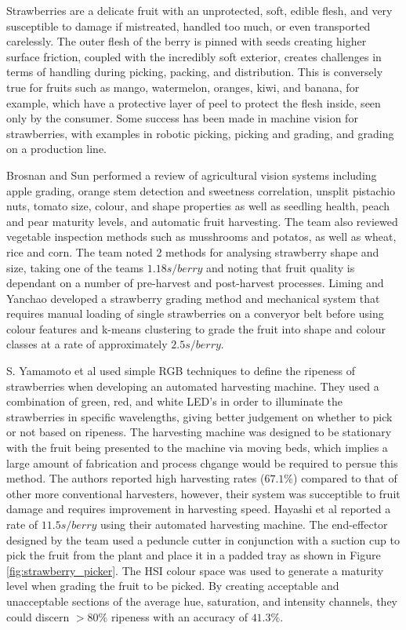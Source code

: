 \documentclass[fleqn,twoside]{article}
\begin{document}
Strawberries are a delicate fruit with an unprotected, soft, edible flesh, and very susceptible to damage if mistreated, handled too much, or even transported carelessly. The outer flesh of the berry is pinned with seeds creating higher surface friction, coupled with the incredibly soft exterior, creates challenges in terms of handling during picking, packing, and distribution. This is conversely true for fruits such as mango, watermelon, oranges, kiwi, and banana, for example, which have a protective layer of peel to protect the flesh inside, seen only by the consumer. Some success has been made in machine vision for strawberries, with examples in robotic picking, picking and grading, and grading on a production line. 

Brosnan and Sun \cite{brosnan} performed a review of agricultural vision systems including apple grading, orange stem detection and sweetness correlation, unsplit pistachio nuts, tomato size, colour, and shape properties as well as seedling health, peach and pear maturity levels, and automatic fruit harvesting. The team also reviewed vegetable inspection methods such as musshrooms and potatos, as well as wheat, rice and corn. The team noted 2 methods for analysing strawberry shape and size, taking one of the teams $1.18 s/berry$ and noting that fruit quality is dependant on a number of pre-harvest and post-harvest processes. Liming and Yanchao \cite{liming} developed a strawberry grading method and mechanical system that requires manual loading of single strawberries on a converyor belt before using colour features and k-means clustering to grade the fruit into shape and colour classes at a rate of approximately $2.5s/berry$. 

S. Yamamoto et al \cite{yamamoto2} used simple RGB techniques to define the ripeness of strawberries when developing an automated harvesting machine. They used a combination of green, red, and white LED's in order to illuminate the strawberries in specific wavelengths, giving better judgement on whether to pick or not based on ripeness. The harvesting machine was designed to be stationary with the fruit being presented to the machine via moving beds, which implies a large amount of fabrication and process chgange would be required to persue this method. The authors reported high harvesting rates ($67.1\%$) compared to that of other more conventional harvesters, however, their system was succeptible to fruit damage and requires improvement in harvesting speed. Hayashi et al \cite{hayashi} reported a rate of $11.5s/berry$ using their automated harvesting machine. The end-effector designed by the team used a peduncle cutter in conjunction with a suction cup to pick the fruit from the plant and place it in a padded tray as shown in Figure \ref{fig:strawberry_picker}. The HSI colour space was used to generate a maturity level when grading the fruit to be picked. By creating acceptable and unacceptable sections of the average hue, saturation, and intensity channels, they could discern $>80\%$ ripeness with an accuracy of $41.3\%$.
\end{document}
